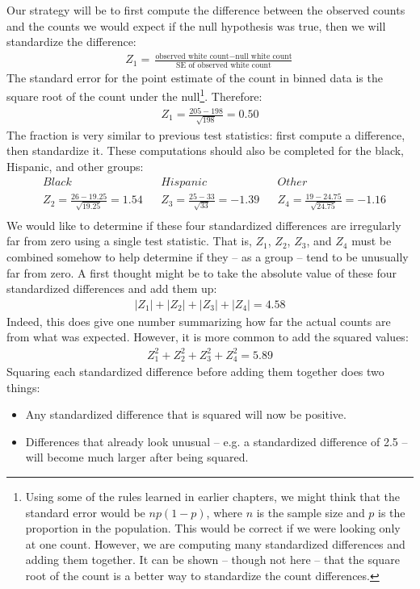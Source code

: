 Our strategy will be to first compute the difference between the observed counts and the counts we would expect if the null hypothesis was true, then we will standardize the difference:
\begin{align*}
Z_{1} = \frac{\text{observed white count} - \text{null white count}}
				{\text{SE of observed white count}}
\end{align*}
The standard error for the point estimate of the count in binned data is the square root of the count under the null\footnote{Using some of the rules learned in earlier chapters, we might think that the standard error would be $np(1-p)$, where $n$ is the sample size and $p$ is the proportion in the population. This would be correct if we were looking only at one count. However, we are computing many standardized differences and adding them together. It can be shown -- though not here -- that the square root of the count is a better way to standardize the count differences.}. Therefore:
\begin{align*}
Z_1 = \frac{205 - 198}{\sqrt{198}} = 0.50
\end{align*}
The fraction is very similar to previous test statistics: first compute a difference, then standardize it. These computations should also be completed for the black, Hispanic, and other groups:
{\footnotesize \begin{align*}
&Black && Hispanic	&&Other \\
&Z_2 = \frac{26-19.25}{\sqrt{19.25}}=1.54
	&&Z_3 = \frac{25-33}{\sqrt{33}}=-1.39
	&& Z_4 = \frac{19-24.75}{\sqrt{24.75}}=-1.16 \\
\end{align*}
}We would like to determine if these four standardized differences are irregularly far from zero using a single test statistic. That is, $Z_1$, $Z_2$, $Z_3$, and $Z_4$ must be combined somehow to help determine if they -- as a group -- tend to be unusually far from zero. A first thought might be to take the absolute value of these four standardized differences and add them up:
\begin{align*}
|Z_1| + |Z_2| + |Z_3| + |Z_4| = 4.58
\end{align*}
Indeed, this does give one number summarizing how far the actual counts are from what was expected. However, it is more common to add the squared values:
\begin{align*}
Z_1^2 + Z_2^2 + Z_3^2 + Z_4^2 = 5.89
\end{align*}
Squaring each standardized difference before adding them together does two things:
\begin{itemize}
\item Any standardized difference that is squared will now be positive.
\item Differences that already look unusual -- e.g. a standardized difference of 2.5 -- will become much larger after being squared.
\end{itemize}

